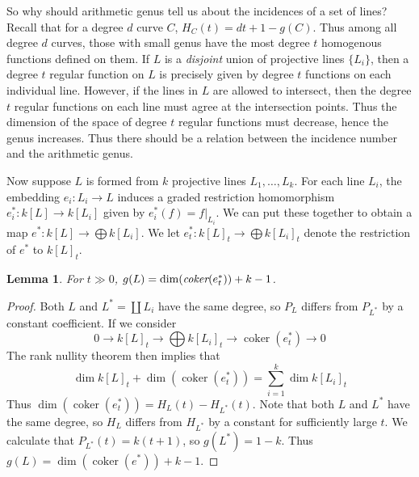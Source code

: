 \documentclass{article}
\theoremstyle{plain}
\newtheorem{lemma}[theorem]{Lemma}
\DeclareMathOperator{\coker}{\text{coker}}
\DeclareMathOperator{\emphcoker}{\emph{coker}}
\begin{document}
 So why should arithmetic genus tell us about the incidences of a set of lines? Recall that for a degree $d$ curve $C$, $H_C(t) = dt + 1 - g(C)$. Thus among all degree $d$ curves, those with small genus have the most degree $t$ homogenous functions defined on them. If $L$ is a {\it disjoint} union of projective lines $\{ L_i \}$, then a degree $t$ regular function on $L$ is precisely given by degree $t$ functions on each individual line. However, if the lines in $L$ are allowed to intersect, then the degree $t$ regular functions on each line must agree at the intersection points. Thus the dimension of the space of degree $t$ regular functions must decrease, hence the genus increases. Thus there should be a relation between the incidence number and the arithmetic genus.

Now suppose $L$ is formed from $k$ projective lines $L_1, \dots, L_k$. For each line $L_i$, the embedding $e_i: L_i \to L$ induces a graded restriction homomorphism $e_i^*: k[L] \to k[L_i]$ given by $e_i^*(f) = f|_{L_i}$. We can put these together to obtain a map $e^*: k[L] \to \bigoplus k[L_i]$. We let $e^*_t: k[L]_t \to \bigoplus k[L_i]_t$ denote the restriction of $e^*$ to $k[L]_t$.

\begin{lemma}
    For $t \gg 0$, $g(L) = \dim(\emphcoker(e^*_t)) + k-1$.
\end{lemma}
\begin{proof}
    Both $L$ and $L^* = \coprod L_i$ have the same degree, so $P_L$ differs from $P_{L^*}$ by a constant coefficient. If we consider
    \[ 0 \to k[L]_t \to \bigoplus k[L_i]_t \to \coker(e^*_t) \to 0 \]
    The rank nullity theorem then implies that
    \[ \dim k[L]_t + \dim (\coker(e^*_t)) = \sum_{i = 1}^k \dim k[L_i]_t \]
    Thus $\dim(\coker(e^*_t)) = H_L(t) - H_{L^*}(t)$. Note that both $L$ and $L^*$ have the same degree, so $H_L$ differs from $H_{L^*}$ by a constant for sufficiently large $t$. We calculate that $P_{L^*}(t) = k(t+1)$, so $g(L^*) = 1-k$. Thus $g(L) = \dim(\coker(e^*)) + k-1$.
\end{proof}
\end{document}
